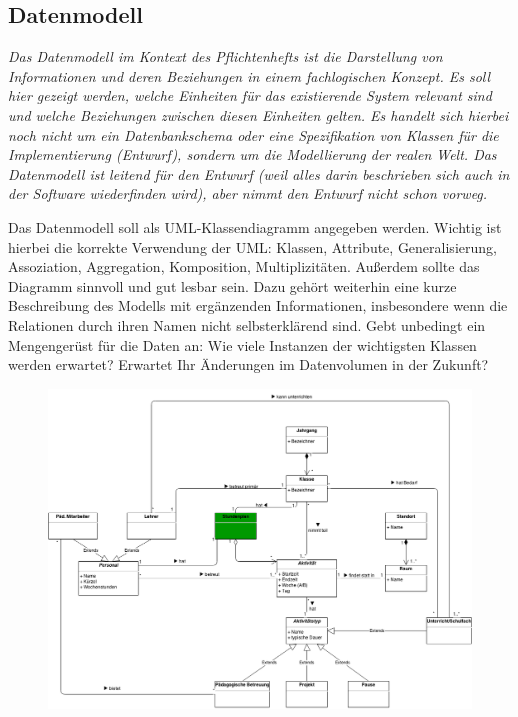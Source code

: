 \documentclass[fontsize=12pt,paper=a4,twoside]{scrartcl}
\begin{document}
\subsection{Datenmodell}
  {\em Das Datenmodell im Kontext des Pflichtenhefts ist {\glqq}die
  Darstellung von Informationen und deren Beziehungen in einem
  fachlogischen Konzept{\grqq}. Es soll hier gezeigt werden, welche
  Einheiten für das existierende System relevant sind und welche
  Beziehungen zwischen diesen Einheiten gelten. Es handelt sich
  hierbei noch nicht um ein Datenbankschema oder eine Spezifikation
  von Klassen für die Implementierung (Entwurf), sondern um die
  Modellierung der realen Welt. Das Datenmodell ist leitend für den
  Entwurf (weil alles darin beschrieben sich auch in der Software 
  wiederfinden wird), aber nimmt den Entwurf nicht schon vorweg.
  
  Das Datenmodell soll als UML-Klassendiagramm angegeben werden.
  Wichtig ist hierbei die korrekte Verwendung der UML: Klassen,
  Attribute, Generalisierung, Assoziation, Aggregation, Komposition,
  Multiplizitäten. Außerdem sollte das Diagramm sinnvoll und gut
  lesbar sein. Dazu gehört weiterhin eine kurze Beschreibung des
  Modells mit ergänzenden Informationen, insbesondere wenn die
  Relationen durch ihren Namen nicht selbsterklärend sind. Gebt
  unbedingt ein Mengengerüst für die Daten an: Wie viele Instanzen der
  wichtigsten Klassen werden erwartet? Erwartet Ihr Änderungen im
  Datenvolumen in der Zukunft?}

\begin{figure}[H]
\includegraphics[width=\textwidth]{datenmodell.png}
\end{figure}
\end{document}
